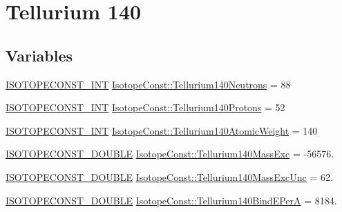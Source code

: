 \hypertarget{group___isotope_const-_tellurium-_te140}{}\section{Tellurium 140}
\label{group___isotope_const-_tellurium-_te140}
\subsection*{Variables}
\begin{DoxyCompactItemize}
\item 
\mbox{\hyperlink{group___isotope_const-_macros_ga5f18360b3e99483a35c32d789e62621c}{I\+S\+O\+T\+O\+P\+E\+C\+O\+N\+S\+T\+\_\+\+I\+NT}} \mbox{\hyperlink{group___isotope_const-_tellurium-_te140_ga83295c6e86a1f0af6ad2e9a9284c5c34}{Isotope\+Const\+::\+Tellurium140\+Neutrons}} = 88
\item 
\mbox{\hyperlink{group___isotope_const-_macros_ga5f18360b3e99483a35c32d789e62621c}{I\+S\+O\+T\+O\+P\+E\+C\+O\+N\+S\+T\+\_\+\+I\+NT}} \mbox{\hyperlink{group___isotope_const-_tellurium-_te140_ga7d79307fdd3d4e9f5d24e4441d3e8c74}{Isotope\+Const\+::\+Tellurium140\+Protons}} = 52
\item 
\mbox{\hyperlink{group___isotope_const-_macros_ga5f18360b3e99483a35c32d789e62621c}{I\+S\+O\+T\+O\+P\+E\+C\+O\+N\+S\+T\+\_\+\+I\+NT}} \mbox{\hyperlink{group___isotope_const-_tellurium-_te140_gae58f531c6acbd3aa5fd51b3136069e12}{Isotope\+Const\+::\+Tellurium140\+Atomic\+Weight}} = 140
\item 
\mbox{\hyperlink{group___isotope_const-_macros_ga8f45a7272ce02c0b4c65c44636ed719a}{I\+S\+O\+T\+O\+P\+E\+C\+O\+N\+S\+T\+\_\+\+D\+O\+U\+B\+LE}} \mbox{\hyperlink{group___isotope_const-_tellurium-_te140_gacace3606b4cc19d1533c025f5916d51f}{Isotope\+Const\+::\+Tellurium140\+Mass\+Exc}} = -\/56576.
\item 
\mbox{\hyperlink{group___isotope_const-_macros_ga8f45a7272ce02c0b4c65c44636ed719a}{I\+S\+O\+T\+O\+P\+E\+C\+O\+N\+S\+T\+\_\+\+D\+O\+U\+B\+LE}} \mbox{\hyperlink{group___isotope_const-_tellurium-_te140_ga7091167ecafba9caa1a006f878cf8195}{Isotope\+Const\+::\+Tellurium140\+Mass\+Exc\+Unc}} = 62.
\item 
\mbox{\hyperlink{group___isotope_const-_macros_ga8f45a7272ce02c0b4c65c44636ed719a}{I\+S\+O\+T\+O\+P\+E\+C\+O\+N\+S\+T\+\_\+\+D\+O\+U\+B\+LE}} \mbox{\hyperlink{group___isotope_const-_tellurium-_te140_ga0316dc34445710b7007468e403221587}{Isotope\+Const\+::\+Tellurium140\+Bind\+E\+PerA}} = 8184.
\item 

\end{DoxyCompactItemize}
